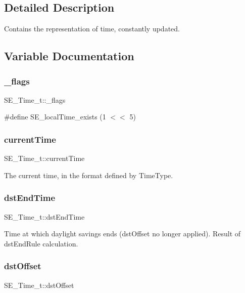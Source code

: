 \subsection{Detailed Description}
Contains the representation of time, constantly updated. 

\subsection{Variable Documentation}
\mbox{\label{group__Time_ga77ececb939204e19a09422aab87ca739}} 
\subsubsection{\texorpdfstring{\+\_\+flags}{\_flags}}
{\footnotesize\ttfamily S\+E\+\_\+\+Time\+\_\+t\+::\+\_\+flags}

\#define S\+E\+\_\+local\+Time\+\_\+exists (1 $<$$<$ 5) \mbox{\label{group__Time_ga5cf45c45c382652cb37ce1a82a5168c5}} 
\subsubsection{\texorpdfstring{current\+Time}{currentTime}}
{\footnotesize\ttfamily S\+E\+\_\+\+Time\+\_\+t\+::current\+Time}

The current time, in the format defined by Time\+Type. \mbox{\label{group__Time_ga37d25a3c96a9202c1cfe1ebba752dfde}} 
\subsubsection{\texorpdfstring{dst\+End\+Time}{dstEndTime}}
{\footnotesize\ttfamily S\+E\+\_\+\+Time\+\_\+t\+::dst\+End\+Time}

Time at which daylight savings ends (dst\+Offset no longer applied). Result of dst\+End\+Rule calculation. \mbox{\label{group__Time_gad39cc4dd3b9a9c27fc6bebc96087e759}} 
\subsubsection{\texorpdfstring{dst\+Offset}{dstOffset}}
{\footnotesize\ttfamily S\+E\+\_\+\+Time\+\_\+t\+::dst\+Offset}

